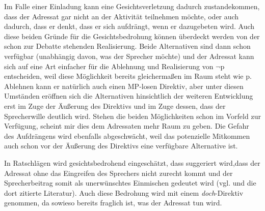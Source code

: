 Im Falle einer Einladung  kann eine Gesichtsverletzung dadurch zustandekommen, dass der Adressat gar nicht an der Aktivität teilnehmen möchte, oder auch dadurch, dass er denkt, dass er sich aufdrängt, wenn er dazugebeten wird. Auch diese beiden Gründe für die Gesichtsbedrohung können überdeckt werden von der schon zur Debatte stehenden Realisierung. Beide Alternativen sind dann schon verfügbar (unabhängig davon, was der Sprecher möchte) und der Adressat kann sich auf eine Art einfacher für die Ablehnung und Realisierung von $\neg$p entscheiden, weil diese Möglichkeit bereits gleichermaßen im Raum steht wie p. Ablehnen kann er natürlich auch einen MP-losen Direktiv, aber unter diesen Umständen eröffnen sich die Alternativen hinsichtlich der weiteren Entwicklung erst im Zuge der Äußerung des Direktivs und im Zuge dessen, dass der Sprecherwille deutlich wird. Stehen die beiden Möglichkeiten schon im Vorfeld zur Verfügung, scheint mir dies dem Adressaten mehr Raum zu geben. Die Gefahr des Aufdrängens wird ebenfalls abgeschwächt, weil das potenzielle Mitkommen auch schon vor der Äußerung des Direktivs eine verfügbare Alternative ist.

In Ratschlägen  wird gesichtsbedrohend  eingeschätzt, dass suggeriert wird,\linebreak dass der Adressat ohne das Eingreifen des Sprechers nicht zurecht kommt und der Sprecherbeitrag somit als unerwünschtes Einmischen gedeutet wird (vgl.\linebreak\citealt[114]{Frank2011} und die dort zitierte Literatur). Auch diese Bedrohung wird mit einem \textit{doch}-Direktiv genommen, da sowieso bereits fraglich ist, was der Adressat tun wird.

